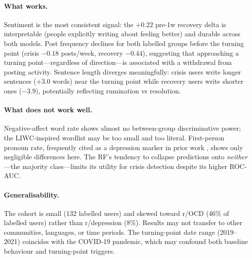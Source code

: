 \documentclass[11pt]{article}
\begin{document}
\paragraph{What works.}
Sentiment is the most consistent signal: the $+0.22$ pre-1w recovery
delta is interpretable (people explicitly writing about feeling better)
and durable across both models.
Post frequency declines for both labelled groups before the turning point
(crisis $-0.18$ posts/week, recovery $-0.44$), suggesting that approaching
a turning point---regardless of direction---is associated with a withdrawal
from posting activity.
Sentence length diverges meaningfully: crisis users write longer sentences
($+3.0$ words) near the turning point while recovery users write shorter
ones ($-3.9$), potentially reflecting rumination vs resolution.

\paragraph{What does not work well.}
Negative-affect word rate shows almost no between-group discriminative
power; the LIWC-inspired wordlist may be too small and too literal.
First-person pronoun rate, frequently cited as a depression marker in
prior work \citep{rude2004language,coppersmith2014quantifying}, shows
only negligible differences here.
The RF's tendency to collapse predictions onto \emph{neither}---the
majority class---limits its utility for crisis detection despite its
higher ROC-AUC.

\paragraph{Generalisability.}
The cohort is small (132 labelled users) and skewed toward r/OCD
(46\% of labelled users) rather than r/depression (8\%).
Results may not transfer to other communities, languages, or time periods.
The turning-point date range (2019--2021) coincides with the COVID-19
pandemic, which may confound both baseline behaviour and turning-point
triggers.
\end{document}
